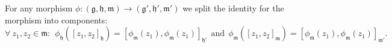 \documentclass [11pt] {article}
\theoremstyle{definition}
\begin{document}
   For any morphism $\phi: (\mathfrak{g},\mathfrak{h},\mathfrak{m})\to
   (\mathfrak{g}',\mathfrak{h}',\mathfrak{m}')$ we split the identity for the morphism into components:
   \begin{equation}\label{EqCompMMComponentsMorph}
   	\forall~z_1,z_2\in\mathfrak{m}:~~
   \phi_\mathfrak{h}	\left([z_1,z_2]_\mathfrak{h}\right)
   =\left[\phi_\mathfrak{m}(z_1),\phi_\mathfrak{m}(z_1)\right]_{\mathfrak{h}'}
   ~~\mathrm{and}~~
   \phi_\mathfrak{m}	\left([z_1,z_2]_\mathfrak{m}\right)
   =\left[\phi_\mathfrak{m}(z_1),\phi_\mathfrak{m}(z_1)\right]_{\mathfrak{m}'} .   
   \end{equation}

%
%

 
\end{document}
